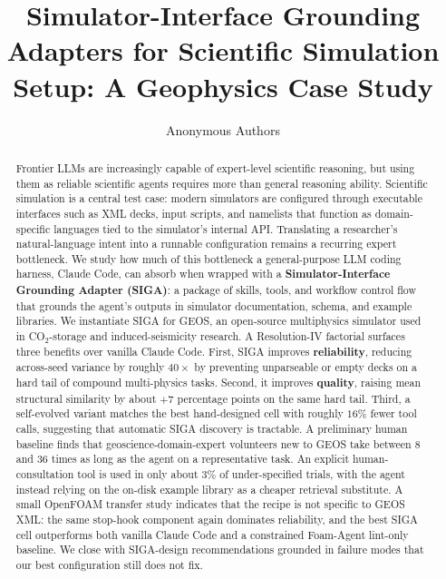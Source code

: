 \documentclass{article}
\title{Simulator-Interface Grounding Adapters for Scientific Simulation Setup: A Geophysics Case Study}
\author{%
  Anonymous Authors\\
}
\begin{document}
\maketitle


\begin{abstract}
Frontier LLMs are increasingly capable of expert-level scientific reasoning, but using them as reliable scientific agents requires more than general reasoning ability. Scientific simulation is a central test case: modern simulators are configured through executable interfaces such as XML decks, input scripts, and namelists that function as domain-specific languages tied to the simulator's internal API. Translating a researcher's natural-language intent into a runnable configuration remains a recurring expert bottleneck. We study how much of this bottleneck a general-purpose LLM coding harness, Claude Code, can absorb when wrapped with a \textbf{Simulator-Interface Grounding Adapter (SIGA)}: a package of skills, tools, and workflow control flow that grounds the agent's outputs in simulator documentation, schema, and example libraries. We instantiate SIGA for GEOS, an open-source multiphysics simulator used in CO$_2$-storage and induced-seismicity research. A Resolution-IV factorial surfaces three benefits over vanilla Claude Code. First, SIGA improves \textbf{reliability}, reducing across-seed variance by roughly $40\times$ by preventing unparseable or empty decks on a hard tail of compound multi-physics tasks. Second, it improves \textbf{quality}, raising mean structural similarity by about $+7$ percentage points on the same hard tail. Third, a self-evolved variant matches the best hand-designed cell with roughly $16\%$ fewer tool calls, suggesting that automatic SIGA discovery is tractable. A preliminary human baseline finds that geoscience-domain-expert volunteers new to GEOS take between 8 and 36 times as long as the agent on a representative task. An explicit human-consultation tool is used in only about $3\%$ of under-specified trials, with the agent instead relying on the on-disk example library as a cheaper retrieval substitute. A small OpenFOAM transfer study indicates that the recipe is not specific to GEOS XML: the same stop-hook component again dominates reliability, and the best SIGA cell outperforms both vanilla Claude Code and a constrained Foam-Agent lint-only baseline. We close with SIGA-design recommendations grounded in failure modes that our best configuration still does not fix.
\end{abstract}
\end{document}
